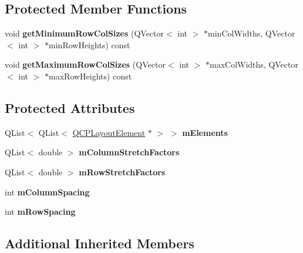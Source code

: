 \subsection*{Protected Member Functions}
\begin{DoxyCompactItemize}
\item 
\hypertarget{class_q_c_p_layout_grid_a4b9a251919936f127a63fc1b9911cd4e}{}\label{class_q_c_p_layout_grid_a4b9a251919936f127a63fc1b9911cd4e} 
void {\bfseries get\+Minimum\+Row\+Col\+Sizes} (Q\+Vector$<$ int $>$ $\ast$min\+Col\+Widths, Q\+Vector$<$ int $>$ $\ast$min\+Row\+Heights) const
\item 
\hypertarget{class_q_c_p_layout_grid_a9be77011ec5b5dfbe7fbda126659e1eb}{}\label{class_q_c_p_layout_grid_a9be77011ec5b5dfbe7fbda126659e1eb} 
void {\bfseries get\+Maximum\+Row\+Col\+Sizes} (Q\+Vector$<$ int $>$ $\ast$max\+Col\+Widths, Q\+Vector$<$ int $>$ $\ast$max\+Row\+Heights) const
\end{DoxyCompactItemize}
\subsection*{Protected Attributes}
\begin{DoxyCompactItemize}
\item 
\hypertarget{class_q_c_p_layout_grid_a3577d3855bf8ad20ef9079291a49f397}{}\label{class_q_c_p_layout_grid_a3577d3855bf8ad20ef9079291a49f397} 
Q\+List$<$ Q\+List$<$ \hyperlink{class_q_c_p_layout_element}{Q\+C\+P\+Layout\+Element} $\ast$ $>$ $>$ {\bfseries m\+Elements}
\item 
\hypertarget{class_q_c_p_layout_grid_ac6aabe62339f94f18b9f8adab94b1840}{}\label{class_q_c_p_layout_grid_ac6aabe62339f94f18b9f8adab94b1840} 
Q\+List$<$ double $>$ {\bfseries m\+Column\+Stretch\+Factors}
\item 
\hypertarget{class_q_c_p_layout_grid_a36c85a7eaf342680fb9b8a4977486f16}{}\label{class_q_c_p_layout_grid_a36c85a7eaf342680fb9b8a4977486f16} 
Q\+List$<$ double $>$ {\bfseries m\+Row\+Stretch\+Factors}
\item 
\hypertarget{class_q_c_p_layout_grid_ae9ac48f0791be07ead0a96dbd5622770}{}\label{class_q_c_p_layout_grid_ae9ac48f0791be07ead0a96dbd5622770} 
int {\bfseries m\+Column\+Spacing}
\item 
\hypertarget{class_q_c_p_layout_grid_a8b67f183f4645739cc4c794d75843b40}{}\label{class_q_c_p_layout_grid_a8b67f183f4645739cc4c794d75843b40} 
int {\bfseries m\+Row\+Spacing}
\end{DoxyCompactItemize}
\subsection*{Additional Inherited Members}


